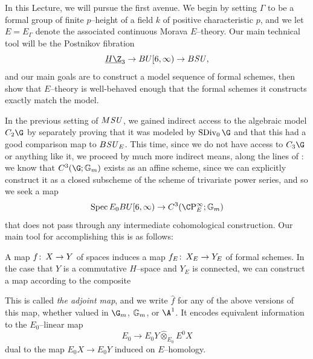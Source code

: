 In this Lecture, we will pursue the first avenue.
We begin by setting \(\Gamma\) to be a formal group of finite \(p\)--height of a field \(k\) of positive characteristic \(p\), and we let \(E = E_\Gamma\) denote the associated continuous Morava \(E\)--theory.
Our main technical tool will be the Postnikov fibration \[\OS{H\Z}{3} \to BU[6, \infty) \to B\SU,\] and our main goals are to construct a model sequence of formal schemes, then show that \(E\)--theory is well-behaved enough that the formal schemes it constructs exactly match the model.

In the previous setting of \(M\mathit{SU}\), we gained indirect access to the algebraic model \(C_2 \G\) by separately proving that it was modeled by \(\SDiv_0 \G\) and that this had a good comparison map to \(B\mathit{SU}_E\).
This time, since we do not have access to \(C_3 \G\) or anything like it, we proceed by much more indirect means, along the lines of : we know that \(C^3(\G; \Gm)\) exists as an affine scheme, since we can explicitly construct it as a closed subscheme of the scheme of trivariate power series, and so we seek a map \[\Spec E_0 BU[6, \infty) \to C^3(\CP^\infty_E; \Gm)\] that does not pass through any intermediate cohomological construction.
Our main tool for accomplishing this is as follows:
\begin{definition}
A map \(f\colon\thinspace X \to Y\) of spaces induces a map \(f_E \colon\thinspace X_E \to Y_E\) of formal schemes.
In the case that \(Y\) is a commutative \(H\)--space and \(Y_E\) is connected, we can construct a map according to the composite
\begin{center}
\end{center}
This is called \textit{the adjoint map}, and we write \(\widehat f\) for any of the above versions of this map, whether valued in \(\G_m\), \(\mathbb G_m\), or \(\A^1\).
It encodes equivalent information to the \(E_0\)--linear map \[E_0 \to E_0 Y \widehat\otimes_{E_0} E^0 X\] dual to the map \(E_0 X \to E_0 Y\) induced on \(E\)--homology.
\end{definition}

